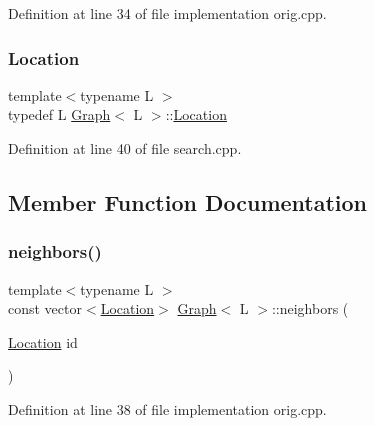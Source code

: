 Definition at line 34 of file implementation orig.\+cpp.

\mbox{\label{struct_graph_aea7d42bb67163fe692353674435a1426}} 
\subsubsection{\texorpdfstring{Location}{Location}\hspace{0.1cm}{\footnotesize\ttfamily [2/2]}}
{\footnotesize\ttfamily template$<$typename L $>$ \\
typedef L \mbox{\hyperlink{struct_graph}{Graph}}$<$ L $>$\+::\mbox{\hyperlink{struct_graph_aea7d42bb67163fe692353674435a1426}{Location}}}



Definition at line 40 of file search.\+cpp.



\subsection{Member Function Documentation}
\mbox{\label{struct_graph_a8389c308ee673e63d574e0a30191662e}} 
\subsubsection{\texorpdfstring{neighbors()}{neighbors()}\hspace{0.1cm}{\footnotesize\ttfamily [1/2]}}
{\footnotesize\ttfamily template$<$typename L $>$ \\
const vector$<$\mbox{\hyperlink{struct_graph_aea7d42bb67163fe692353674435a1426}{Location}}$>$ \mbox{\hyperlink{struct_graph}{Graph}}$<$ L $>$\+::neighbors (\begin{DoxyParamCaption}\item[{\mbox{\hyperlink{struct_graph_aea7d42bb67163fe692353674435a1426}{Location}}}]{id }\end{DoxyParamCaption})\hspace{0.3cm}{\ttfamily [inline]}}



Definition at line 38 of file implementation orig.\+cpp.

